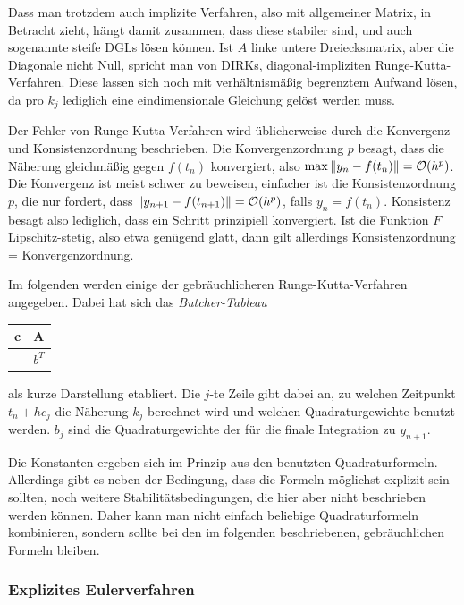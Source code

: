 Dass man trotzdem auch implizite Verfahren, also mit allgemeiner
Matrix, in Betracht zieht, hängt damit zusammen, dass diese stabiler
sind, und auch sogenannte steife DGLs lösen können. Ist $A$ linke
untere Dreiecksmatrix, aber die Diagonale nicht Null, spricht man von
DIRKs, diagonal-impliziten Runge-Kutta-Verfahren. Diese lassen sich
noch mit verhältnismäßig begrenztem Aufwand lösen, da pro $k_j$
lediglich eine eindimensionale Gleichung gelöst werden muss.

Der Fehler von Runge-Kutta-Verfahren wird üblicherweise durch die
Konvergenz- und Konsistenzordnung beschrieben. Die Konvergenzordnung
$p$ besagt, dass die Näherung gleichmäßig gegen $f(t_n)$ konvergiert, also
$\max \left\lVert{y_n - f(t_n)}\right\rVert = \mathcal O(h^p)$. Die Konvergenz ist
meist schwer zu beweisen, einfacher ist die Konsistenzordnung $p$, die
nur fordert, dass $\left\lVert{y_{n+1} - f(t_{n+1})}\right\rVert = \mathcal O(h^p)$, falls
$y_n=f(t_n)$. Konsistenz besagt also lediglich, dass ein Schritt
prinzipiell konvergiert. Ist die Funktion $F$ Lipschitz-stetig, also
etwa genügend glatt, dann gilt allerdings Konsistenzordnung =
Konvergenzordnung.

%
Im folgenden werden einige der gebräuchlicheren Runge-Kutta-Verfahren
angegeben. Dabei hat sich das \emph{Butcher-Tableau}
\begin{center}
  \renewcommand{\arraystretch}{1.3}
  \begin{tabular}{r|l}
    c & A \\\hline
    & $b^T$
  \end{tabular}
\end{center}
als kurze Darstellung etabliert. Die $j$-te Zeile gibt dabei an, zu
welchen Zeitpunkt $t_n + hc_j$ die Näherung $k_j$ berechnet wird und
welchen Quadraturgewichte benutzt werden. $b_j$ sind die
Quadraturgewichte der für die finale Integration zu $y_{n+1}$.

Die Konstanten ergeben sich im Prinzip aus den benutzten
Quadraturformeln. Allerdings gibt es neben der Bedingung, dass die
Formeln möglichst explizit sein sollten, noch weitere
Stabilitätsbedingungen, die hier aber nicht beschrieben werden
können. Daher kann man nicht einfach beliebige Quadraturformeln
kombinieren, sondern sollte bei den im folgenden beschriebenen,
gebräuchlichen Formeln bleiben.

\subsubsection{Explizites Eulerverfahren}

